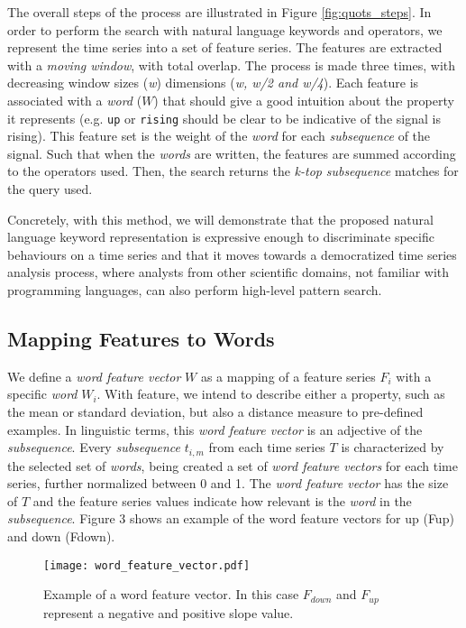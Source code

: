 The overall steps of the process are illustrated in Figure \ref{fig:quots_steps}. In order to perform the search with natural language keywords and operators, we represent the time series into a set of feature series. The features are extracted with a \textit{moving window}, with total overlap. The process is made three times, with decreasing window sizes (\textit{w}) dimensions (\textit{w, w/2 and w/4}). Each feature is associated with a \textit{word} ($W$) that should give a good intuition about the property it represents (e.g. \texttt{up} or \texttt{rising} should be clear to be indicative of the signal is rising). This feature set is the weight of the \textit{word} for each \textit{subsequence} of the signal. Such that when the \textit{words} are written, the features are summed according to the operators used. Then, the search returns the \textit{k-top} \textit{subsequence} matches for the query used.
\par
Concretely, with this method, we will demonstrate that the proposed natural language keyword representation is expressive enough to discriminate specific behaviours on a time series and that it moves towards a democratized time series analysis process, where analysts from other scientific domains, not familiar with programming languages, can also perform high-level pattern search.

\subsection{Mapping Features to Words}

We define a \textit{word feature vector} $W$ as a mapping of a feature series $F_i$ with a specific \textit{word} $W_i$. With feature, we intend to describe either a property, such as the mean or standard deviation, but also a distance measure to pre-defined examples. In linguistic terms, this \textit{word feature vector} is an adjective of the \textit{subsequence}. Every \textit{subsequence} $t_{i,m}$ from each time series $T$ is characterized by the selected set of \textit{words},  being created a set of \textit{word feature vectors} for each time series, further normalized between 0 and 1. The \textit{word feature vector} has the size of $T$ and the feature series values indicate how relevant is the \textit{word} in the \textit{subsequence}. Figure 3 shows an example of the word feature vectors for \textcolor{myblue4}{up (Fup)} and \textcolor{myblue3}{down (Fdown)}.

\begin{figure}[!h]
\centering
\texttt{[image: word\_feature\_vector.pdf]}
\caption{Example of a word feature vector. In this case $F_{down}$ and $F_{up}$ represent a negative and positive slope value.}
\label{fig:wfv_example}
\end{figure}

